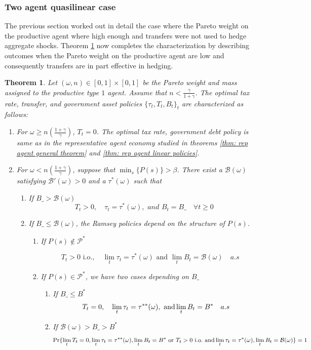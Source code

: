 \documentclass[thmsb,11pt]{article}
\newtheorem{theorem}{Theorem}
\begin{document}

\subsubsection{Two agent quasilinear case}

The previous section worked out in detail the case where the Pareto weight on the productive agent where high enough and transfers were not used to hedge aggregate shocks. Theorem \ref{thm heterogeneous agents} now completes the characterization by describing outcomes when  the Pareto weight on the productive agent are low and consequently transfers are in part effective in hedging. 
 
 
\begin{theorem}
\label{thm heterogeneous agents}
Let $(\omega,n) \in [0,1] \times [0,1]$ be the Pareto weight and mass assigned to the  productive type $1$ agent.  Assume that $n<\frac{\gamma}{1+\gamma}$.
The optimal tax rate, transfer, and government asset policies $\{\tau_t,T_t,B_t\}_t$ are characterized as follows:


\begin{enumerate}
 \item For $\omega\geq n \left(\frac{1+\gamma}{\gamma}\right)$,  $T_t=0$.  The optimal tax rate, government debt policy is same as in the representative agent economy studied in
 theorems \ref{thm: rep agent general theorem} and \ref{thm: rep agent linear policies}.
 \item For $\omega< n \left(\frac{1+\gamma}{\gamma}\right)$, suppose that $\min_{s}\{P(s)\}>\beta$. There exist  a $\mathcal{B}(\omega)$  satisfying $\mathcal{B}'(\omega)>0$ and a $\tau^*(\omega)$ such that
 \begin{enumerate}
  \item If $B\_>\mathcal{B(\omega)}$
\[T_t>0, \quad \tau_t=\tau^*(\omega), \textit{ and } B_t=B\_ \quad \forall t \geq 0 \]
\item If $B\_\leq \mathcal{B(\omega)}$, the Ramsey policies depend on the structure of $P(s)$.
\begin{enumerate}
 \item If $P(s)\not \in \mathcal{P}^*$

   \[ T_t>0 \text{ i.o.},\quad \lim_t\tau_t=\tau^*(\omega) \text{ and } \lim_tB_t=\mathcal{B}(\omega)\quad \textit{a.s}\]

 \item If $P(s)\in \mathcal{P}^*$, we have two cases depending on $B\_$
\begin{enumerate}
 \item If $B\_\leq B^*$
 \[T_t = 0, \quad \lim_t \tau_t=\tau^{**} (\omega), \ {\rm  and } \lim_tB_t=  B^*\quad a.s \]
\item If $\mathcal{B}(\omega)>B\_>B^*$
\small
\[\Pr\{\lim_t T_t = 0, \lim_t \tau_t=\tau^{**}(\omega),\lim_tB_t=  B^* \textrm{ or }  T_t>0 \text{ i.o.} \ {\rm and } \lim_t\tau_t=\tau^*(\omega), \lim_tB_t=\mathcal{B}(\omega) \}=1 \]
 \normalsize
\end{enumerate}


\end{enumerate}
\end{enumerate}
\end{enumerate}
\end{theorem}
\end{document}
